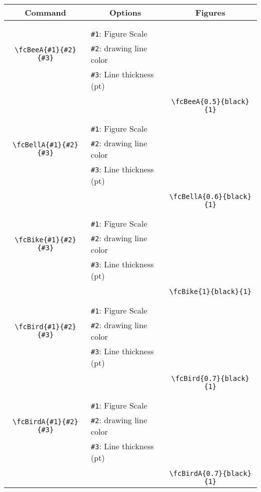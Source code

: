 \documentclass{article}
\begin{document}
\begin{table}[H]\centering\begin{tabular}{|c|l|c|}\hline {\bf Command}& \multicolumn{1}{c|}{{\bf Options}} & {\bf Figures}\\  \hline	&&\multirow{5}{*}{\fcBeeA{0.5}{black}{1}}\\	&&\\	&\verb|#1|: Figure Scale &\\	\verb|\fcBeeA{#1}{#2}{#3}|&	\verb|#2|: drawing line color &\\	&\verb|#3|: Line thickness (pt) &\\ &&\\&&	\verb|\fcBeeA{0.5}{black}{1}|\\\hline 	
	&&\multirow{5}{*}{\fcBellA{0.6}{black}{1}}\\	&&\\	&\verb|#1|: Figure Scale &\\	\verb|\fcBellA{#1}{#2}{#3}|&	\verb|#2|: drawing line color &\\	&\verb|#3|: Line thickness (pt) &\\ &&\\&&	\verb|\fcBellA{0.6}{black}{1}|\\\hline 	
	&&\multirow{5}{*}{\fcBike{1}{black}{1}}\\	&&\\	&\verb|#1|: Figure Scale &\\	\verb|\fcBike{#1}{#2}{#3}|&	\verb|#2|: drawing line color &\\	&\verb|#3|: Line thickness (pt) &\\ &&\\&&	\verb|\fcBike{1}{black}{1}|\\\hline 	
	&&\multirow{5}{*}{\fcBird{0.7}{black}{1}}\\	&&\\	&\verb|#1|: Figure Scale &\\	\verb|\fcBird{#1}{#2}{#3}|&	\verb|#2|: drawing line color &\\	&\verb|#3|: Line thickness (pt) &\\ &&\\&&	\verb|\fcBird{0.7}{black}{1}|\\\hline 	
	&&\multirow{5}{*}{\fcBirdA{0.7}{black}{1}}\\	&&\\	&\verb|#1|: Figure Scale &\\	\verb|\fcBirdA{#1}{#2}{#3}|&	\verb|#2|: drawing line color &\\	&\verb|#3|: Line thickness (pt) &\\ &&\\&&	\verb|\fcBirdA{0.7}{black}{1}|\\\hline 	

\end{tabular}
\end{table}
\end{document}
